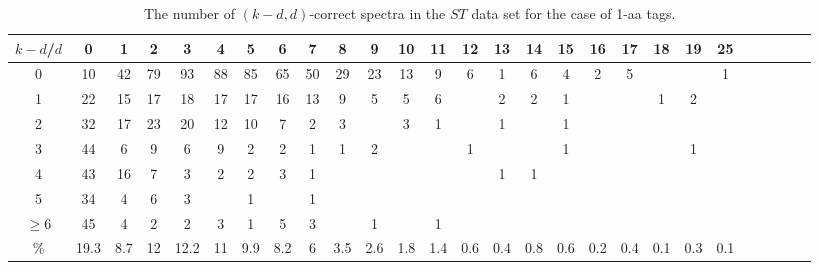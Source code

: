 \documentclass{article}[12pt]
\begin{document}
\begin{landscape}

\begin{table}[h]\footnotesize
{\centering
\begin{tabular}{|c|c|
c|c|c|c|c|c|c|c|c|c|c|c|c|c|c|c|c|c|c|c|c|c|c|c|c|}
  \hline
  $k-d$/$d$ 
 & 0 & 1 & 2 & 3 & 4 & 5 & 6 & 7 & 8 & 9 & 10 & 11 & 12 & 13 & 14 & 15 & 16 & 17 & 18 & 19 & 25\\

  \hline
  \hline

0 & 10 & 42 & 79 & 93 & 88 & 85 & 65 & 50 & 29 & 23 & 13 & 9 & 6 & 1 & 6 & 4 & 2 & 5 &  &  & 1\\

1 & 22 & 15 & 17 & 18 & 17 & 17 & 16 & 13 & 9 & 5 & 5 & 6 &  & 2 & 2 & 1 &  &  & 1 & 2 & \\

2 & 32 & 17 & 23 & 20 & 12 & 10 & 7 & 2 & 3 &  & 3 & 1 &  & 1 &  & 1 &  &  &  &  & \\

3 & 44 & 6 & 9 & 6 & 9 & 2 & 2 & 1 & 1 & 2 &  &  & 1 &  &  & 1 &  &  &  & 1 & \\

4 & 43 & 16 & 7 & 3 & 2 & 2 & 3 & 1 &  &  &  &  &  & 1 & 1 &  &  &  &  &  & \\

5 & 34 & 4 & 6 & 3 &  & 1 &  & 1 &  &  &  &  &  &  &  &  &  &  &  &  & \\

$\ge6 $  & 45 & 4 & 2 & 2 & 3 & 1 & 5 & 3 &  & 1 &  & 1 &  &  &  &  &  &  &  &  & \\

  \hline

 \%  & 19.3 & 8.7 & 12 & 12.2 & 11 & 9.9 & 8.2 & 6 & 3.5 & 2.6 & 1.8 & 1.4 & 0.6 & 0.4 & 0.8 & 0.6 & 0.2 & 0.4 & 0.1 & 0.3 & 0.1\\

  \hline
\end{tabular}
\par}
\centering
\caption{The number of $(k-d,d)$-correct spectra in the $ST$ data set for the case of 1-aa tags.}
\vspace{3mm}
\label{table:kd-1-correct-ST2}
\end{table}
\end{landscape}
\end{document}
